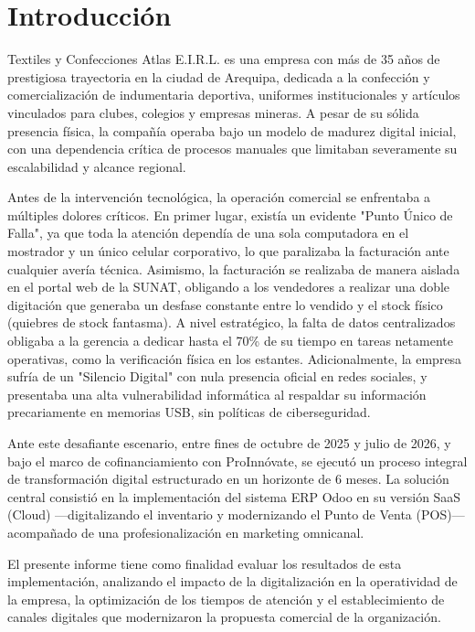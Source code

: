 \section{Introducción}

Textiles y Confecciones Atlas E.I.R.L. es una empresa con más de 35 años de prestigiosa trayectoria en la ciudad de Arequipa, dedicada a la confección y comercialización de indumentaria deportiva, uniformes institucionales y artículos vinculados para clubes, colegios y empresas mineras. A pesar de su sólida presencia física, la compañía operaba bajo un modelo de madurez digital inicial, con una dependencia crítica de procesos manuales que limitaban severamente su escalabilidad y alcance regional.

Antes de la intervención tecnológica, la operación comercial se enfrentaba a múltiples dolores críticos. En primer lugar, existía un evidente "Punto Único de Falla", ya que toda la atención dependía de una sola computadora en el mostrador y un único celular corporativo, lo que paralizaba la facturación ante cualquier avería técnica. Asimismo, la facturación se realizaba de manera aislada en el portal web de la SUNAT, obligando a los vendedores a realizar una doble digitación que generaba un desfase constante entre lo vendido y el stock físico (quiebres de stock fantasma). A nivel estratégico, la falta de datos centralizados obligaba a la gerencia a dedicar hasta el 70\% de su tiempo en tareas netamente operativas, como la verificación física en los estantes. Adicionalmente, la empresa sufría de un "Silencio Digital" con nula presencia oficial en redes sociales, y presentaba una alta vulnerabilidad informática al respaldar su información precariamente en memorias USB, sin políticas de ciberseguridad.

Ante este desafiante escenario, entre fines de octubre de 2025 y julio de 2026, y bajo el marco de cofinanciamiento con ProInnóvate, se ejecutó un proceso integral de transformación digital estructurado en un horizonte de 6 meses. La solución central consistió en la implementación del sistema ERP Odoo en su versión SaaS (Cloud) ---digitalizando el inventario y modernizando el Punto de Venta (POS)--- acompañado de una profesionalización en marketing omnicanal.

El presente informe tiene como finalidad evaluar los resultados de esta implementación, analizando el impacto de la digitalización en la operatividad de la empresa, la optimización de los tiempos de atención y el establecimiento de canales digitales que modernizaron la propuesta comercial de la organización.
